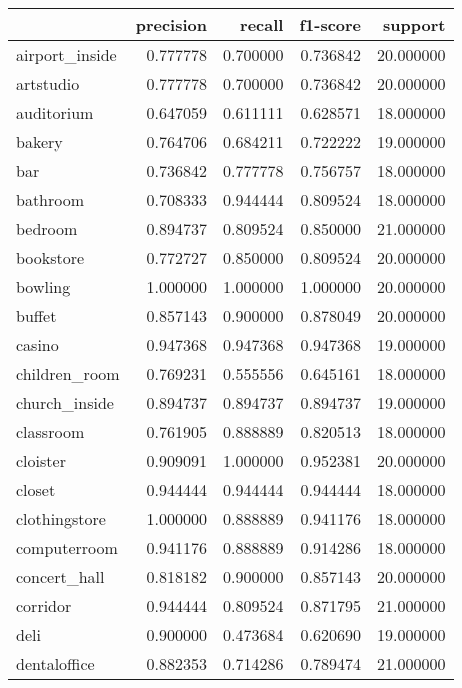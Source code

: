 \begin{tabular}{lrrrr}
\toprule
{} &  precision &    recall &  f1-score &      support \\
\midrule
airport\_inside      &   0.777778 &  0.700000 &  0.736842 &    20.000000 \\
artstudio           &   0.777778 &  0.700000 &  0.736842 &    20.000000 \\
auditorium          &   0.647059 &  0.611111 &  0.628571 &    18.000000 \\
bakery              &   0.764706 &  0.684211 &  0.722222 &    19.000000 \\
bar                 &   0.736842 &  0.777778 &  0.756757 &    18.000000 \\
bathroom            &   0.708333 &  0.944444 &  0.809524 &    18.000000 \\
bedroom             &   0.894737 &  0.809524 &  0.850000 &    21.000000 \\
bookstore           &   0.772727 &  0.850000 &  0.809524 &    20.000000 \\
bowling             &   1.000000 &  1.000000 &  1.000000 &    20.000000 \\
buffet              &   0.857143 &  0.900000 &  0.878049 &    20.000000 \\
casino              &   0.947368 &  0.947368 &  0.947368 &    19.000000 \\
children\_room       &   0.769231 &  0.555556 &  0.645161 &    18.000000 \\
church\_inside       &   0.894737 &  0.894737 &  0.894737 &    19.000000 \\
classroom           &   0.761905 &  0.888889 &  0.820513 &    18.000000 \\
cloister            &   0.909091 &  1.000000 &  0.952381 &    20.000000 \\
closet              &   0.944444 &  0.944444 &  0.944444 &    18.000000 \\
clothingstore       &   1.000000 &  0.888889 &  0.941176 &    18.000000 \\
computerroom        &   0.941176 &  0.888889 &  0.914286 &    18.000000 \\
concert\_hall        &   0.818182 &  0.900000 &  0.857143 &    20.000000 \\
corridor            &   0.944444 &  0.809524 &  0.871795 &    21.000000 \\
deli                &   0.900000 &  0.473684 &  0.620690 &    19.000000 \\
dentaloffice        &   0.882353 &  0.714286 &  0.789474 &    21.000000 \\

\end{tabular}
